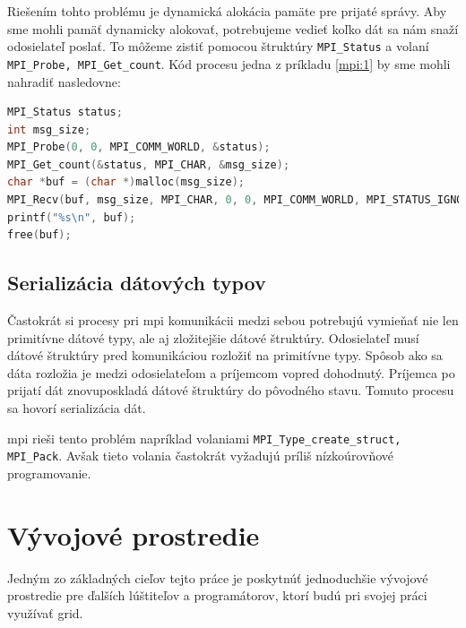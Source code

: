 Riešením tohto problému je dynamická alokácia pamäte pre prijaté správy. Aby sme mohli pamäť dynamicky alokovať, potrebujeme vedieť
koľko dát sa nám snaží odosielateľ poslať. To môžeme zistiť pomocou štruktúry \texttt{MPI\_Status} a volaní \texttt{MPI\_Probe, MPI\_Get\_count}.
Kód procesu jedna z príkladu \ref{mpi:1} by sme mohli nahradiť nasledovne:
\begin{lstlisting}[language=c]
MPI_Status status;
int msg_size;
MPI_Probe(0, 0, MPI_COMM_WORLD, &status);
MPI_Get_count(&status, MPI_CHAR, &msg_size);
char *buf = (char *)malloc(msg_size);
MPI_Recv(buf, msg_size, MPI_CHAR, 0, 0, MPI_COMM_WORLD, MPI_STATUS_IGNORE);
printf("%s\n", buf);
free(buf);
\end{lstlisting}

\subsection{Serializácia dátových typov}
\label{kap:serialize}
Častokrát si procesy pri \acrshort{mpi} komunikácii medzi sebou potrebujú vymieňať nie len primitívne dátové typy, ale aj zložitejšie dátové štruktúry.
Odosielateľ musí dátové štruktúry pred komunikáciou rozložiť na primitívne typy. Spôsob ako sa dáta rozložia je medzi odosielateľom a príjemcom vopred dohodnutý.
Príjemca po prijatí dát znovuposkladá dátové štruktúry do pôvodného stavu. Tomuto procesu sa hovorí serializácia dát.

\acrshort{mpi} rieši tento problém napríklad volaniami \texttt{MPI\_Type\_create\_struct, MPI\_Pack}.
Avšak tieto volania častokrát vyžadujú príliš nízkoúrovňové programovanie.


\section{Vývojové prostredie}
Jedným zo základných cieľov tejto práce je poskytnúť jednoduchšie vývojové prostredie pre ďalších lúštiteľov a programátorov,
ktorí budú pri svojej práci využívať grid.

